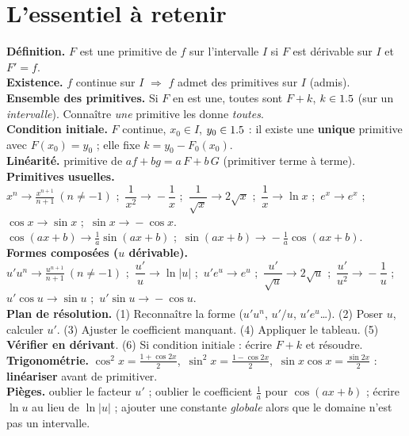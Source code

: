 \section{L'essentiel à retenir}

\begin{synthese}
\textbf{Définition.} $F$ est une primitive de $f$ sur l'intervalle $I$ si $F$ est dérivable sur $I$ et $F'=f$.\\[4pt]
\textbf{Existence.} $f$ continue sur $I$ $\Rightarrow$ $f$ admet des primitives sur $I$ (admis).\\[4pt]
\textbf{Ensemble des primitives.} Si $F$ en est une, toutes sont $F+k$, $k\in1.5$ (sur un \emph{intervalle}).
Connaître \emph{une} primitive les donne \emph{toutes}.\\[4pt]
\textbf{Condition initiale.} $F$ continue, $x_0\in I$, $y_0\in1.5$ : il existe une \textbf{unique} primitive avec
$F(x_0)=y_0$ ; elle fixe $k=y_0-F_0(x_0)$.\\[4pt]
\textbf{Linéarité.} primitive de $af+bg=a\,F+b\,G$ (primitiver terme à terme).\\[4pt]
\textbf{Primitives usuelles.}\\
$\displaystyle x^{n}\!\to\!\frac{x^{n+1}}{n+1}\ (n\ne-1)$ ;\
$\dfrac1{x^{2}}\!\to\!-\dfrac1x$ ;\
$\dfrac1{\sqrt x}\!\to\!2\sqrt x$ ;\
$\dfrac1x\!\to\!\ln x$ ;\
$e^{x}\!\to\!e^{x}$ ;\
$\cos x\!\to\!\sin x$ ;\
$\sin x\!\to\!-\cos x$.\\
$\cos(ax+b)\!\to\!\frac1a\sin(ax+b)$ ;\ $\sin(ax+b)\!\to\!-\frac1a\cos(ax+b)$.\\[4pt]
\textbf{Formes composées ($u$ dérivable).}\\
$\displaystyle u'u^{n}\!\to\!\frac{u^{n+1}}{n+1}\ (n\ne-1)$ ;\
$\dfrac{u'}{u}\!\to\!\ln|u|$ ;\
$u'e^{u}\!\to\!e^{u}$ ;\
$\dfrac{u'}{\sqrt u}\!\to\!2\sqrt u$ ;\
$\dfrac{u'}{u^{2}}\!\to\!-\dfrac1u$ ;\
$u'\cos u\!\to\!\sin u$ ;\
$u'\sin u\!\to\!-\cos u$.\\[4pt]
\textbf{Plan de résolution.} (1) Reconnaître la forme ($u'u^n$, $u'/u$, $u'e^u$\dots).
(2) Poser $u$, calculer $u'$. (3) Ajuster le coefficient manquant. (4) Appliquer le tableau.
(5) \textbf{Vérifier en dérivant}. (6) Si condition initiale : écrire $F+k$ et résoudre.\\[4pt]
\textbf{Trigonométrie.} $\cos^{2}x=\frac{1+\cos2x}{2}$,\ $\sin^{2}x=\frac{1-\cos2x}{2}$,\
$\sin x\cos x=\frac{\sin2x}{2}$ : \textbf{linéariser} avant de primitiver.\\[4pt]
\textbf{Pièges.} oublier le facteur $u'$ ; oublier le coefficient $\frac1a$ pour $\cos(ax+b)$ ;
écrire $\ln u$ au lieu de $\ln|u|$ ; ajouter une constante \emph{globale} alors que le domaine
n'est pas un intervalle.
\end{synthese}

